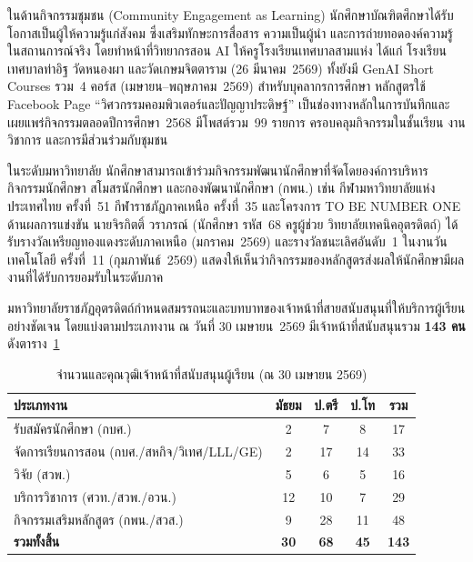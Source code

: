 ในด้านกิจกรรมชุมชน (Community Engagement as Learning) นักศึกษาบัณฑิตศึกษาได้รับโอกาสเป็นผู้ให้ความรู้แก่สังคม ซึ่งเสริมทักษะการสื่อสาร ความเป็นผู้นำ และการถ่ายทอดองค์ความรู้ในสถานการณ์จริง โดยทำหน้าที่วิทยากรสอน AI ให้ครูโรงเรียนเทศบาลสามแห่ง ได้แก่ โรงเรียนเทศบาลท่าอิฐ วัดหนองผา และวัดเกษมจิตตาราม (26 มีนาคม~2569) ทั้งยังมี GenAI Short Courses รวม~4 คอร์ส (เมษายน--พฤษภาคม~2569) สำหรับบุคลากรการศึกษา หลักสูตรใช้ Facebook Page ``วิศวกรรมคอมพิวเตอร์และปัญญาประดิษฐ์'' เป็นช่องทางหลักในการบันทึกและเผยแพร่กิจกรรมตลอดปีการศึกษา~2568 มีโพสต์รวม~99 รายการ ครอบคลุมกิจกรรมในชั้นเรียน งานวิชาการ และการมีส่วนร่วมกับชุมชน

ในระดับมหาวิทยาลัย นักศึกษาสามารถเข้าร่วมกิจกรรมพัฒนานักศึกษาที่จัดโดยองค์การบริหารกิจกรรมนักศึกษา สโมสรนักศึกษา และกองพัฒนานักศึกษา (กพน.) เช่น กีฬามหาวิทยาลัยแห่งประเทศไทย ครั้งที่~51 กีฬาราชภัฏภาคเหนือ ครั้งที่~35 และโครงการ TO BE NUMBER ONE ด้านผลการแข่งขัน นายจิรกิตติ์ วราภรณ์ (นักศึกษา รหัส~68 ครูผู้ช่วย วิทยาลัยเทคนิคอุตรดิตถ์) ได้รับรางวัลเหรียญทองแดงระดับภาคเหนือ (มกราคม~2569) และรางวัลชนะเลิศอันดับ~1 ในงานวันเทคโนโลยี ครั้งที่~11 (กุมภาพันธ์~2569) แสดงให้เห็นว่ากิจกรรมของหลักสูตรส่งผลให้นักศึกษามีผลงานที่ได้รับการยอมรับในระดับภาค


มหาวิทยาลัยราชภัฏอุตรดิตถ์กำหนดสมรรถนะและบทบาทของเจ้าหน้าที่สายสนับสนุนที่ให้บริการผู้เรียนอย่างชัดเจน โดยแบ่งตามประเภทงาน ณ วันที่ 30 เมษายน~2569 มีเจ้าหน้าที่สนับสนุนรวม \textbf{143 คน} ดังตาราง~\ref{tbl:support_staff}

\begin{table}[H]
  \centering
  \caption{จำนวนและคุณวุฒิเจ้าหน้าที่สนับสนุนผู้เรียน (ณ 30 เมษายน 2569)}
  \label{tbl:support_staff}
  \begingroup
  \footnotesize
  \setlength{\tabcolsep}{3pt}
  \renewcommand{\arraystretch}{1.2}
  \begin{tabularx}{\linewidth}{|>{\raggedright\arraybackslash}X|c|c|c|c|}
    \hline
    \textbf{ประเภทงาน} & \textbf{มัธยม} & \textbf{ป.ตรี} & \textbf{ป.โท} & \textbf{รวม} \\
    \hline
    รับสมัครนักศึกษา (กบศ.) & 2 & 7 & 8 & 17 \\
    \hline
    จัดการเรียนการสอน (กบศ./สหกิจ/วิเทศ/LLL/GE) & 2 & 17 & 14 & 33 \\
    \hline
    วิจัย (สวพ.) & 5 & 6 & 5 & 16 \\
    \hline
    บริการวิชาการ (ศวท./สวพ./อวน.) & 12 & 10 & 7 & 29 \\
    \hline
    กิจกรรมเสริมหลักสูตร (กพน./สวส.) & 9 & 28 & 11 & 48 \\
    \hline
    \textbf{รวมทั้งสิ้น} & \textbf{30} & \textbf{68} & \textbf{45} & \textbf{143} \\
    \hline
  \end{tabularx}
  \endgroup
\end{table}

